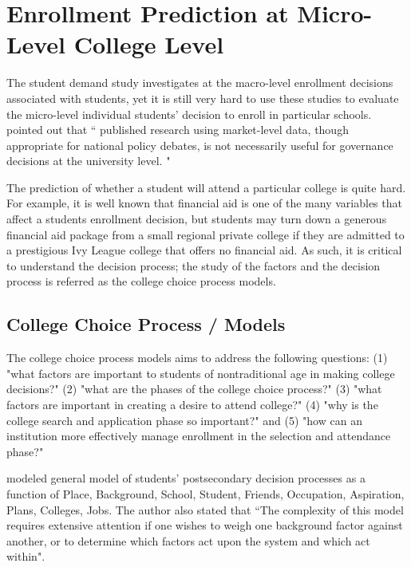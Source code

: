 \documentclass[12pt,english]{report}
\begin{document}
\section{Enrollment Prediction at Micro-Level College Level}
The student demand study investigates at the macro-level enrollment decisions
associated with students, yet it is still very hard to use these studies to
evaluate the micro-level individual students' decision to enroll in
particular schools. \citet{Carter2011} pointed out that `` published research
using market-level data, though appropriate for national policy debates, is not
necessarily useful for governance decisions at the university level. "

The prediction of whether a student  will attend a particular college is quite
hard.  For example,  it is well known that financial aid is one of the many
variables that affect a students enrollment decision, but students may turn
down a generous financial aid package from a small regional private college if
they are admitted to a prestigious Ivy League college that offers no financial
aid.  As such, it is critical to understand the decision process; the study of
the factors and the decision process is referred as the college choice process
models.

\subsection{College Choice Process / Models} 
The college choice process models aims to address the following questions: (1)
"what factors are important to students of nontraditional age in making college
decisions?" (2) "what are the phases of the college choice process?" (3) "what
factors are important in creating a desire to attend college?" (4) "why is the
college search and application phase so important?" and (5) "how can an
institution more effectively manage enrollment in the selection and attendance
phase?" \citep{Paulsen1990}

\citet{Jackson1978}  modeled general model of students' postsecondary decision
processes as a function of Place, Background, School, Student, Friends,
Occupation, Aspiration, Plans, Colleges, Jobs.  The author also stated that
``The complexity of this model requires extensive attention if one wishes to
weigh one background factor against another, or to determine which  factors act
upon the system and which act within".
\end{document}
